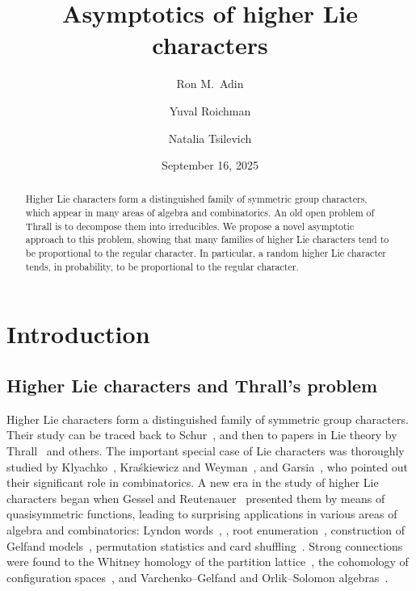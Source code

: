 \documentclass[12pt]%
{amsart}
\title{Asymptotics of higher Lie characters}
\author[R.\ M.\ Adin]{Ron M.\ Adin}
\author[Y.\ Roichman]{Yuval Roichman}
\author[N.\ Tsilevich]{Natalia Tsilevich}
\date{September 16, 2025}
\theoremstyle{plain}
\theoremstyle{definition}
\theoremstyle{remark}
\begin{document}
\begin{abstract} 
    Higher Lie characters form a distinguished family of symmetric group characters, which appear in many areas of algebra and combinatorics. An old open problem of Thrall is to decompose them into irreducibles. 
    We propose a novel asymptotic approach to this problem, showing that many families of 
    higher Lie characters 
    tend to be proportional to the regular character. 
    In particular, a random higher Lie character 
    tends, in probability, to be proportional to the regular character.
\end{abstract}

\maketitle

\tableofcontents

\section{Introduction}

\subsection{Higher Lie characters and Thrall's problem}

Higher Lie characters form a distinguished family of symmetric group characters. 
Their study can be traced back to Schur~\cite{Schur}, and then to  papers in Lie theory by Thrall~\cite{Thrall} 
and others. 
The important special case of Lie characters was thoroughly studied by Klyachko~\cite{Klyachko}, Kra\'skiewicz and Weyman~\cite{KraskiewiczWeyman}, and Garsia~\cite{Garsia}, who pointed out 
their significant role in combinatorics. 
A new era in the study of higher Lie characters began when Gessel and Reutenauer~\cite{GR93} presented them by means of quasisymmetric functions, leading to surprising applications in various areas of algebra and combinatorics: Lyndon words~\cite[Ch.~7]{Reutenauer}, \cite[Exercise 7.89]{Stanley_ECII}, root enumeration~\cite[Ex.~7.69]{Stanley_ECII}, construction of Gelfand models~\cite{Inglis}, permutation statistics 
and card shuffling~\cite{Saliola}. 
Strong connections were found to the Whitney homology of the partition lattice~\cite{Stanley1982},  
the cohomology of configuration spaces~\cite{Hersh}, 
and Varchenko--Gelfand and Orlik--Solomon algebras~\cite{Almousa}. 
\end{document}

